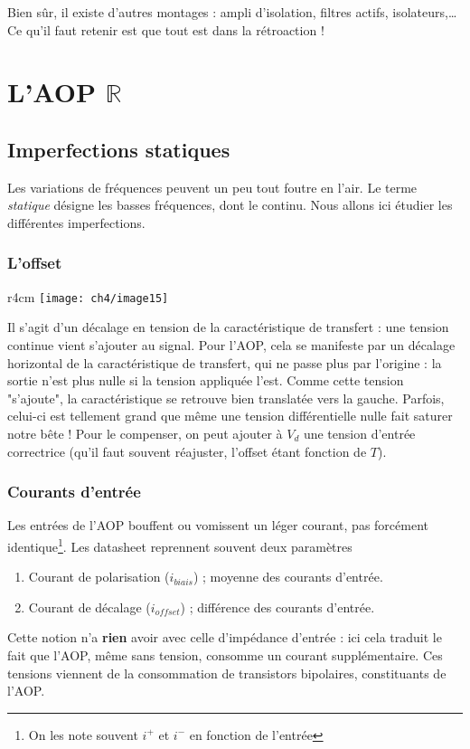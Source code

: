 	Bien sûr, il existe d'autres montages : ampli d'isolation, filtres actifs, 
	isolateurs,\dots Ce qu'il faut retenir est que tout est dans la 
	rétroaction !
	
	
\section{L'AOP $\mathbb{R}$}
	\subsection{Imperfections statiques}
	Les variations de fréquences peuvent un peu tout foutre en l'air. Le terme 
	\textit{statique} désigne les basses fréquences, dont le continu. Nous allons 
	ici étudier les différentes imperfections.
	
		\subsubsection{L'offset}
		\begin{wrapfigure}[9]{r}{4cm}
		\vspace{-0.98cm}
		\texttt{[image: ch4/image15]}
		\end{wrapfigure}	
		Il s'agit d'un décalage en tension de la caractéristique de transfert : 
		une tension continue vient s'ajouter au signal. Pour l'AOP, cela se 
		manifeste par un décalage horizontal de la caractéristique de 
		transfert, qui ne passe plus par l'origine : la sortie n'est plus 
		nulle si la tension appliquée l'est. Comme cette tension "s'ajoute", 
		la caractéristique se retrouve bien translatée vers la gauche. Parfois, 
		celui-ci est tellement grand que même une tension différentielle nulle 
		fait saturer notre bête !
		Pour le compenser, on peut ajouter à $V_d$ une tension d'entrée 
		correctrice (qu'il faut souvent réajuster, l'offset étant fonction de $T$).
		
		\subsubsection{Courants d'entrée}
		Les entrées de l'AOP bouffent ou vomissent un léger courant, pas forcément 
		identique\footnote{On les note souvent $i^+$ et $i^-$ en fonction de 
		l'entrée}. Les datasheet reprennent souvent deux paramètres 
		\begin{enumerate}
		\item Courant de polarisation ($i_{biais}$) ; moyenne des courants d'entrée.
		\item Courant de décalage ($i_{offset}$) ; différence des courants d'entrée.
		\end{enumerate}
		\danger Cette notion n'a \textbf{rien} avoir avec celle d'impédance 
		d'entrée : ici cela traduit le fait que l'AOP, même sans tension, 
		consomme un courant supplémentaire. Ces tensions viennent de la consommation 
		de transistors bipolaires, constituants de l'AOP.
		
